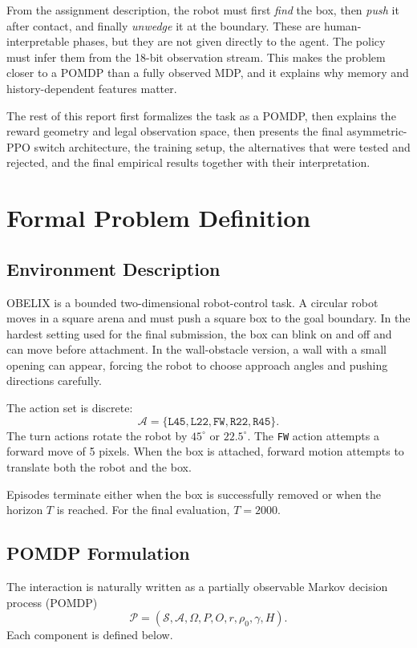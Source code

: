 \documentclass[11pt]{article}
\begin{document}
From the assignment description, the robot must first \emph{find} the box, then
\emph{push} it after contact, and finally \emph{unwedge} it at the boundary. These are
human-interpretable phases, but they are not given directly to the agent. The policy
must infer them from the 18-bit observation stream. This makes the problem closer to a
POMDP than a fully observed MDP, and it explains why memory and history-dependent
features matter.

The rest of this report first formalizes the task as a POMDP, then explains the reward
geometry and legal observation space, then presents the final asymmetric-PPO switch
architecture, the training setup, the alternatives that were tested and rejected, and the
final empirical results together with their interpretation.

\section{Formal Problem Definition}

\subsection{Environment Description}

OBELIX is a bounded two-dimensional robot-control task. A circular robot moves in a
square arena and must push a square box to the goal boundary. In the hardest setting
used for the final submission, the box can blink on and off and can move before
attachment. In the wall-obstacle version, a wall with a small opening can appear,
forcing the robot to choose approach angles and pushing directions carefully.

The action set is discrete:
\[
  \mathcal{A} = \{\texttt{L45},\texttt{L22},\texttt{FW},\texttt{R22},\texttt{R45}\}.
\]
The turn actions rotate the robot by \(45^\circ\) or \(22.5^\circ\). The \texttt{FW} action
attempts a forward move of 5 pixels. When the box is attached, forward motion attempts
to translate both the robot and the box.

Episodes terminate either when the box is successfully removed or when the horizon
\(T\) is reached. For the final evaluation, \(T=2000\).

\subsection{POMDP Formulation}

The interaction is naturally written as a partially observable Markov decision process
(POMDP)
\[
  \mathcal{P}=(\mathcal{S},\mathcal{A},\Omega,P,O,r,\rho_0,\gamma,H).
\]
Each component is defined below.
\end{document}
